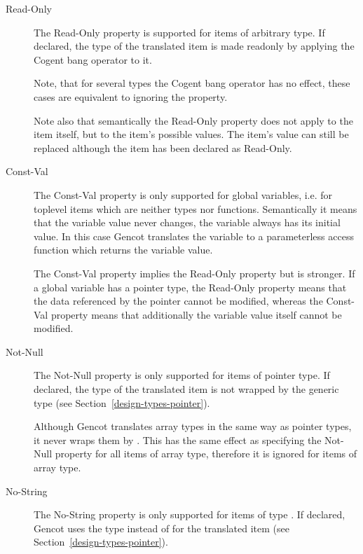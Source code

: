 \begin{description}
\item[Read-Only]

The Read-Only property is supported for items of arbitrary type. If declared, the type of the translated item is
made readonly by applying the Cogent bang operator \code{!} to it.

Note, that for several types the Cogent bang operator has no effect, these cases are equivalent
to ignoring the property.

Note also that semantically the Read-Only property does not apply to the item itself, but to the item’s possible 
values. The item’s value can still be replaced although the item has been declared as Read-Only.

\item[Const-Val]

The Const-Val property is only supported for global variables, i.e. for toplevel items which are neither types nor 
functions. Semantically it means that the variable value never changes, the variable always has its initial value. 
In this case Gencot translates the variable to a parameterless access function which returns the variable value. 

The Const-Val property implies the Read-Only property but is stronger. If a global variable has a pointer type, 
the Read-Only property means that the data referenced by the pointer cannot be modified, whereas the Const-Val 
property means that additionally the variable value itself cannot be modified.

\item[Not-Null]

The Not-Null property is only supported for items of pointer type. If declared, the type of the translated item
is not wrapped by the generic  type (see Section~\ref{design-types-pointer}). 

Although Gencot translates array types in the same way as pointer types, it never wraps them by .
This has the same effect as specifying the Not-Null property for all items of array type, therefore it is ignored
for items of array type.

\item[No-String]

The No-String property is only supported for items of type . If declared, Gencot uses the  
type  instead of  for the translated item (see Section~\ref{design-types-pointer}).


\end{description}
